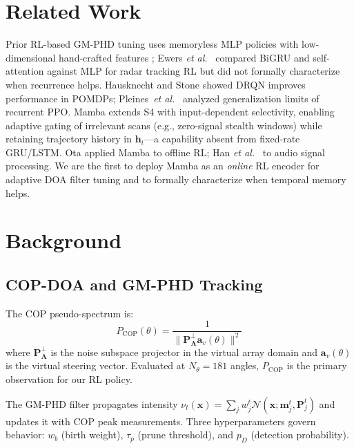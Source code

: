 \documentclass[journal]{IEEEtran}
\def\mat#1{\mathbf{#1}}
\def\vec#1{\mathbf{#1}}
\begin{document}
\section{Related Work}
\label{sec:related}

Prior RL-based GM-PHD tuning uses memoryless MLP policies with low-dimensional
hand-crafted features \cite{rosello2018marlmot,stephan2022scene}; Ewers
\emph{et al.}\ \cite{ewers2025multitarget} compared BiGRU and self-attention
against MLP for radar tracking RL but did not formally characterize when
recurrence helps.
Hausknecht and Stone \cite{hausknecht2015drqn} showed DRQN improves
performance in POMDPs; Pleines~\textit{et al.}\ \cite{pleines2022recurrent} analyzed
generalization limits of recurrent PPO.
Mamba \cite{gu2023mamba} extends S4 \cite{gu2022s4} with input-dependent
selectivity, enabling adaptive gating of irrelevant scans (e.g., zero-signal
stealth windows) while retaining trajectory history in $\vec{h}_t$---a
capability absent from fixed-rate GRU/LSTM.
Ota \cite{ota2024decisionmamba} applied Mamba to offline RL;
Han \emph{et al.}\ \cite{han2024audiomamba} to audio signal processing.
We are the first to deploy Mamba as an \emph{online} RL encoder for
adaptive DOA filter tuning and to formally characterize when temporal
memory helps.


\section{Background}
\label{sec:background}

\subsection{COP-DOA and GM-PHD Tracking}

The COP pseudo-spectrum is:
\begin{equation}
  P_{\mathrm{COP}}(\theta) =
  \frac{1}{\|\mat{P}_{\mat{A}}^\perp \vec{a}_v(\theta)\|^2}
  \label{eq:cop_spectrum}
\end{equation}
where $\mat{P}_{\mat{A}}^\perp$ is the noise subspace projector
in the virtual array domain and $\vec{a}_v(\theta)$ is the virtual
steering vector. Evaluated at $N_\theta{=}181$ angles,
$P_{\mathrm{COP}}$ is the primary observation for our RL policy.

The GM-PHD filter propagates intensity
$\nu_t(\vec{x}) = \sum_j w_j^t \mathcal{N}(\vec{x};\vec{m}_j^t,
\mat{P}_j^t)$ and updates it with COP peak measurements.
Three hyperparameters govern behavior:
$w_b$ (birth weight), $\tau_p$ (prune threshold),
and $p_D$ (detection probability).
\end{document}

